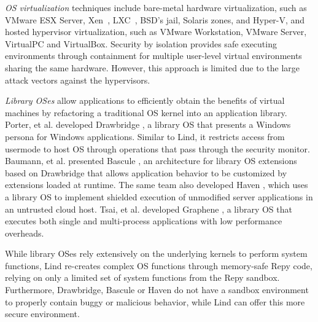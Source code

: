 \textit{OS virtualization}
techniques include
bare-metal hardware virtualization, such as VMware ESX Server, Xen~\cite{Xen-03},
LXC~\cite{LXC}, BSD's jail, Solaris zones, and Hyper-V, and
hosted hypervisor virtualization, such as VMware
Workstation, VMware Server, VirtualPC and VirtualBox.
Security by isolation \cite{Qubes, Overshadow, SecureVM, HypSec}
provides safe executing environments through containment for multiple
user-level virtual environments sharing the same hardware.
However, this approach is limited due to
the large attack vectors against the hypervisors.

\textit{Library OSes}
allow applications to efficiently obtain the benefits of virtual machines
by refactoring a traditional OS kernel into an application library.
Porter, et al. developed Drawbridge \cite{Drawbridge-11},
a library OS
that presents a Windows persona for %
Windows applications. Similar to Lind,
it restricts access from usermode to host OS through
operations that pass through the security monitor.
%
%
Baumann, et al. presented Bascule \cite{Bascule}, an architecture for library OS extensions
based on Drawbridge that allows application behavior to be customized by
extensions loaded at runtime. The same team also developed Haven \cite{Haven},
which uses a library OS to implement
shielded execution of unmodified server applications
in an untrusted cloud host.
Tsai, et al. developed Graphene \cite{Graphene-14}, a library OS that
executes both single and
multi-process applications with low performance overheads.

While library OSes rely extensively on
the underlying kernels to perform system functions,
Lind re-creates complex OS functions through memory-safe Repy
code, relying on only a limited set of system functions from the Repy
sandbox. Furthermore, Drawbridge, Bascule or Haven
do not have a sandbox environment to properly contain
buggy or malicious behavior, while Lind can offer this more secure environment.

